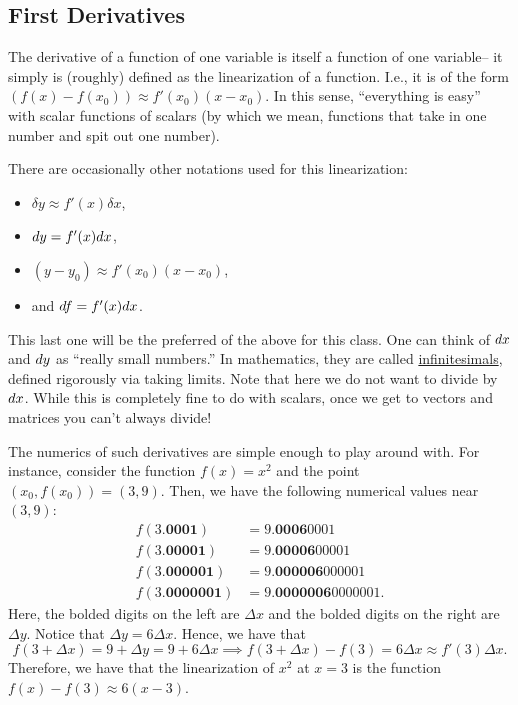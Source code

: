 \subsection{First Derivatives}

The derivative of a function of one variable is itself a function of one variable-- it simply is (roughly) defined as the linearization of a function. I.e., it is of the form $(f(x)-f(x_0)) \approx f'(x_0) (x-x_0)$. In this sense, ``everything is easy'' with scalar functions of scalars (by which we mean, functions that take in one number and spit out one number).

There are occasionally other notations used for this linearization:
\begin{itemize}
    \item $\delta y \approx f'(x) \delta x$,
    \item $d y = f'(x) d x$,
    \item $(y-y_0) \approx f'(x_0)(x-x_0)$,
    \item and $d f = f'(x)  d x$.
\end{itemize}
This last one will be the preferred of the above for this class. One can think of $d x$ and $d y$ as ``really small numbers.'' In mathematics, they are called \href{https://en.wikipedia.org/wiki/Infinitesimal}{infinitesimals}, defined rigorously via taking limits. Note that here we do not want to divide by $d x$. While this is completely fine to do with scalars, once we get to vectors and matrices you can't always divide!

The numerics of such derivatives are simple enough to play around with. For instance, consider the function $f(x) = x^2$ and the point $(x_0,f(x_0)) = (3,9)$. Then, we have the following numerical values near $(3,9)$:
\begin{align*}
    f(3.\mathbf{0001}) &= 9.\mathbf{0006}0001 \\
    f(3.\mathbf{00001}) &= 9.\mathbf{00006}00001 \\
    f(3.\mathbf{000001}) &= 9.\mathbf{000006}000001 \\
    f(3.\mathbf{0000001}) &= 9.\mathbf{0000006}0000001.
\end{align*}
Here, the bolded digits on the left are $\Delta x$ and the bolded digits on the right are $\Delta y$. Notice that $\Delta y = 6\Delta x$. Hence, we have that 
\[
f(3+\Delta x) = 9 + \Delta y = 9+6\Delta x \implies f(3+\Delta x) - f(3) = 6\Delta x \approx f'(3)\Delta x.
\]
Therefore, we have that the linearization of $x^2$ at $x=3$ is the function $f(x)-f(3) \approx 6(x-3)$.

